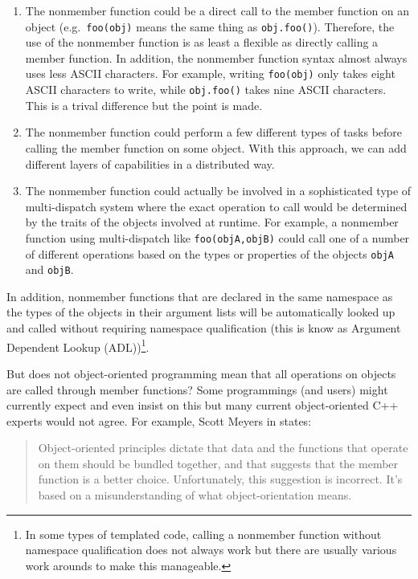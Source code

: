 \documentclass[pdf,ps2pdf,11pt]{SANDreport}
\begin{document}
\begin{enumerate}

{}\item{}The nonmember function could be a direct call to the member function
on an object (e.g.\ {}\texttt{foo(obj)} means the same thing as
{}\texttt{obj.foo()}).  Therefore, the use of the nonmember function is as
least a flexible as directly calling a member function.  In addition, the
nonmember function syntax almost always uses less ASCII characters.  For
example, writing {}\texttt{foo(obj)} only takes eight ASCII characters to
write, while {}\texttt{obj.foo()} takes nine ASCII characters.  This is a
trival difference but the point is made.

{}\item{}The nonmember function could perform a few different types of tasks
before calling the member function on some object.  With this approach, we can
add different layers of capabilities in a distributed way.

{}\item{}The nonmember function could actually be involved in a sophisticated
type of multi-dispatch system where the exact operation to call would be
determined by the traits of the objects involved at runtime.  For example, a
nonmember function using multi-dispatch like {}\texttt{foo(objA,objB)} could
call one of a number of different operations based on the types or properties
of the objects {}\texttt{objA} and {}\texttt{objB}.

\end{enumerate}

In addition, nonmember functions that are declared in the same namespace as
the types of the objects in their argument lists will be automatically looked
up and called without requiring namespace qualification (this is know as
Argument Dependent Lookup (ADL))\footnote{In some types of templated code,
calling a nonmember function without namespace qualification does not always
work but there are usually various work arounds to make this manageable.}.

But does not object-oriented programming mean that all operations on objects
are called through member functions?  Some programmings (and users) might
currently expect and even insist on this but many current object-oriented C++
experts would not agree.  For example, Scott Meyers in {}\cite[Item
23]{EffectiveC++3rd} states:

\begin{quote}

Object-oriented principles dictate that data and the functions that operate on
them should be bundled together, and that suggests that the member function is
a better choice.  Unfortunately, this suggestion is incorrect.  It's based on
a misunderstanding of what object-orientation means.

\end{quote}
\end{document}

